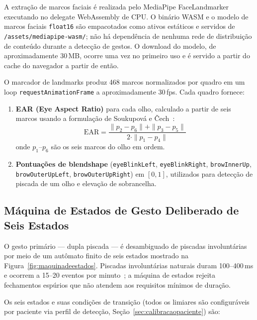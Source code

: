 A extração de marcos faciais é realizada pelo MediaPipe
FaceLandmarker~\cite{lugaresi2019mediapipe} executando no delegate WebAssembly de CPU.
O binário WASM e o modelo de marcos faciais \texttt{float16} são empacotados como
ativos estáticos e servidos de \texttt{/assets/mediapipe-wasm/}; não há dependência de
nenhuma rede de distribuição de conteúdo durante a detecção de gestos. O download do
modelo, de aproximadamente 30\,MB, ocorre uma vez no primeiro uso e é servido a partir
do cache do navegador a partir de então.

O marcador de landmarks produz 468 marcos normalizados por quadro em um loop
\texttt{requestAnimationFrame} a aproximadamente 30\,fps. Cada quadro fornece:
\begin{enumerate}
  \item \textbf{EAR (Eye Aspect Ratio)} para cada olho, calculado a partir de seis
    marcos usando a formulação de Soukupová e Čech~\cite{soukupova2016}:
    \begin{equation}
      \text{EAR} = \frac{\|p_2 - p_6\| + \|p_3 - p_5\|}{2 \cdot \|p_1 - p_4\|}
      \label{eq:ear}
    \end{equation}
    onde $p_1$--$p_6$ são os seis marcos do olho em ordem.
  \item \textbf{Pontuações de blendshape} (\texttt{eyeBlinkLeft}, \texttt{eyeBlinkRight},
    \texttt{browInnerUp}, \texttt{browOuterUpLeft}, \texttt{browOuterUpRight}) em $[0,1]$,
    utilizados para detecção de piscada de um olho e elevação de sobrancelha.
\end{enumerate}

\subsection{Máquina de Estados de Gesto Deliberado de Seis Estados}
\label{sec:maquinadeestados}

O gesto primário — dupla piscada — é desambiguado de piscadas involuntárias por meio
de um autômato finito de seis estados mostrado na Figura~\ref{fig:maquinadeestados}.
Piscadas involuntárias naturais duram 100--400\,ms e ocorrem a 15--20 eventos por
minuto~\cite{bentivoglio1997}; a máquina de estados rejeita fechamentos espúrios que
não atendem aos requisitos mínimos de duração.

Os seis estados e suas condições de transição (todos os limiares são configuráveis
por paciente via perfil de detecção, Seção~\ref{sec:calibracaopaciente}) são:


